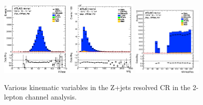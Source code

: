 \begin{figure}[ht]
    \centering
   \includegraphics[width=0.30\textwidth]{figures/2lep/reweighting/after_reweighting/C_0ptag2pjet_0ptv_CRVjet_Fid_llMass_Lin.eps}
   \includegraphics[width=0.30\textwidth]{figures/2lep/reweighting/after_reweighting/C_0ptag2pjet_0ptv_CRVjet_Fid_Mlljj_Lin.eps}
  \includegraphics[width=0.30\textwidth]{figures/2lep/reweighting/after_reweighting/C_0ptag2pjet_0ptv_CRVjet_Fid_MVHadRes_Lin.eps}
  \caption{ Various kinematic variables in the Z+jets resolved CR in the 2-lepton channel analysis.}
   \label{fig:2lep_zjets_resolved_CR}
\end{figure}

